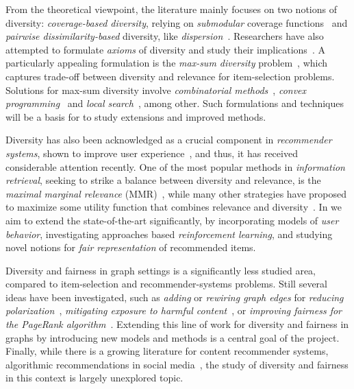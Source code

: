 \documentclass[a4paper,11pt]{article}
\begin{document}
From the theoretical viewpoint, the literature mainly focuses on two notions of diversity: 
\emph{coverage-based diversity}, relying on \emph{submodular} coverage functions~\cite{bach2013learning} 
and \emph{pairwise dissimilarity-based} diversity, like \emph{dispersion}~\cite{hassin1997approximation}.
Researchers have also attempted to formulate \emph{axioms} of diversity and study
their implications~\cite{gollapudi2009axiomatic}. 
A particularly appealing formulation is the \emph{max-sum diversity} problem~\cite{borodin2012max},
which captures trade-off between diversity and relevance for item-selection problems.
Solutions for max-sum diversity involve \emph{combinatorial methods}~\cite{borodin2012max},
\emph{convex programming}~\cite{cevallos2016max} and 
\emph{local search}~\cite{cevallos2019improved}, among other.
Such formulations and techniques will be a basis for {\acronym}
to study extensions and improved methods. 


Diversity has also been acknowledged as a crucial component in \emph{recommender systems},
shown to improve user experience~\cite{Castells2022}, 
and thus, it has received considerable attention recently. 
One of the most popular methods in \emph{information retrieval},
seeking to strike a balance between diversity and relevance, 
is the \emph{maximal marginal relevance} (MMR)~\cite{MMR}, 
while many other strategies have proposed to 
maximize some utility function that combines relevance and diversity~\cite{DUM,DPMF}.
In \acronym we aim to extend the state-of-the-art significantly, 
by incorporating models of \emph{user behavior}, 
investigating approaches based \emph{reinforcement learning}, 
and studying novel notions for \emph{fair representation} of recommended items. 


Diversity and fairness in graph settings is a significantly less studied area,
compared to item-selection and recommender-systems problems.
Still several ideas have been investigated, 
such as \emph{adding} or \emph{rewiring graph edges} for
\emph{reducing polarization}~\cite{adriaens2023minimizing,cinus2023rebalancing,haddadan2022reducing},
\emph{mitigating exposure to harmful content}~\cite{coupette2023reducing,fabbri2022rewiring}, 
or \emph{improving fairness for the Page\-Rank algorithm}~\cite{tsioutsiouliklis2022link}.
Extending this line of work for diversity and fairness in graphs
by introducing new models and methods
is a central goal of the \acronym project.
Finally, while there is a growing literature for content recommender systems, 
algorithmic recommendations in social media~\cite{wang2021user}, 
the study of diversity and fairness in this context is largely unexplored topic.
\end{document}
